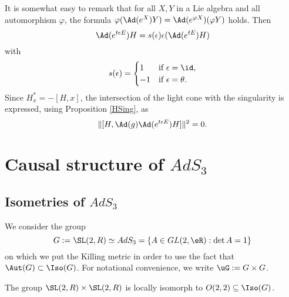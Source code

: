 It is somewhat easy to remark that for all $X,Y$ in a Lie algebra and all automorphism $\varphi$, the formula $\varphi(\Ad(e^X)Y)=\Ad(e^{\varphi X})(\varphi Y)$ holds. Then
\begin{equation}
\Ad(e^{t\epsilon E})H=s(\epsilon)\epsilon(\Ad(e^{tE})H)
\end{equation}
with
\[
  s(\epsilon)=
\begin{cases}
1&\text{if $\epsilon=\id$},\\
-1&\text{if $\epsilon=\theta$}.
\end{cases}
\]
Since $H^*_x=-[H,x]$, the intersection of the light cone with the singularity is expressed, using Proposition \ref{HSing}, as
\begin{equation}
\|[H,\Ad(g)\Ad(e^{t\epsilon E})H]\|^2=0.
\end{equation}

\section{Causal structure of \texorpdfstring{$AdS_3$}{AdS3}}

\subsection{Isometries of \texorpdfstring{$AdS_3$}{AdS3}}

We consider the group
\[
   G:=\SL(2,R)\simeq AdS_3=\{A\in GL(2,\eR):\det A=1\}
\]
on which we put the Killing metric in order to use the fact that $\Aut(G)\subset\Iso(G)$. For notational convenience, we write $\uG:=G\times G$.

\begin{lemma}
The group $\SL(2,R)\times\SL(2,R)$ is locally isomorph to $O(2,2)\subseteq \Iso(G)$.
\end{lemma}

